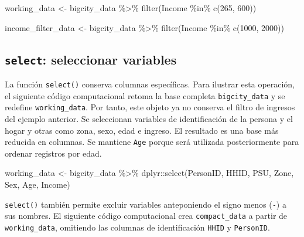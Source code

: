 \documentclass[
  spanish,
  11pt,
  letterpaper,
  oneside,
  open=any]{scrbook}
\newenvironment{Shaded}{\begin{snugshade}}{\end{snugshade}}
\newcommand{\DecValTok}[1]{\textcolor[rgb]{0.68,0.00,0.00}{#1}}
\newcommand{\FunctionTok}[1]{\textcolor[rgb]{0.28,0.35,0.67}{#1}}
\newcommand{\NormalTok}[1]{\textcolor[rgb]{0.00,0.23,0.31}{#1}}
\newcommand{\OtherTok}[1]{\textcolor[rgb]{0.00,0.23,0.31}{#1}}
\newcommand{\SpecialCharTok}[1]{\textcolor[rgb]{0.37,0.37,0.37}{#1}}
\begin{document}
\begin{Shaded}
\begin{Highlighting}[]
\NormalTok{working\_data }\OtherTok{\textless{}{-}}\NormalTok{ bigcity\_data }\SpecialCharTok{\%\textgreater{}\%}
  \FunctionTok{filter}\NormalTok{(Income }\SpecialCharTok{\%in\%} \FunctionTok{c}\NormalTok{(}\DecValTok{265}\NormalTok{, }\DecValTok{600}\NormalTok{))}

\NormalTok{income\_filter\_data }\OtherTok{\textless{}{-}}\NormalTok{ bigcity\_data }\SpecialCharTok{\%\textgreater{}\%}
  \FunctionTok{filter}\NormalTok{(Income }\SpecialCharTok{\%in\%} \FunctionTok{c}\NormalTok{(}\DecValTok{1000}\NormalTok{, }\DecValTok{2000}\NormalTok{))}
\end{Highlighting}
\end{Shaded}

\subsection{\texorpdfstring{\texttt{select}: seleccionar
variables}{select: seleccionar variables}}\label{select-seleccionar-variables}

La función \texttt{select()} conserva columnas específicas. Para
ilustrar esta operación, el siguiente código computacional retoma la
base completa \texttt{bigcity\_data} y se redefine
\texttt{working\_data}. Por tanto, este objeto ya no conserva el filtro
de ingresos del ejemplo anterior. Se seleccionan variables de
identificación de la persona y el hogar y otras como zona, sexo, edad e
ingreso. El resultado es una base más reducida en columnas. Se mantiene
\texttt{Age} porque será utilizada posteriormente para ordenar registros
por edad.

\begin{Shaded}
\begin{Highlighting}[]
\NormalTok{working\_data }\OtherTok{\textless{}{-}}\NormalTok{ bigcity\_data }\SpecialCharTok{\%\textgreater{}\%}
\NormalTok{  dplyr}\SpecialCharTok{::}\FunctionTok{select}\NormalTok{(PersonID, HHID, PSU, Zone, Sex, Age, Income)}
\end{Highlighting}
\end{Shaded}

\texttt{select()} también permite excluir variables anteponiendo el
signo menos (\texttt{-}) a sus nombres. El siguiente código
computacional crea \texttt{compact\_data} a partir de
\texttt{working\_data}, omitiendo las columnas de identificación
\texttt{HHID} y \texttt{PersonID}.
\end{document}
